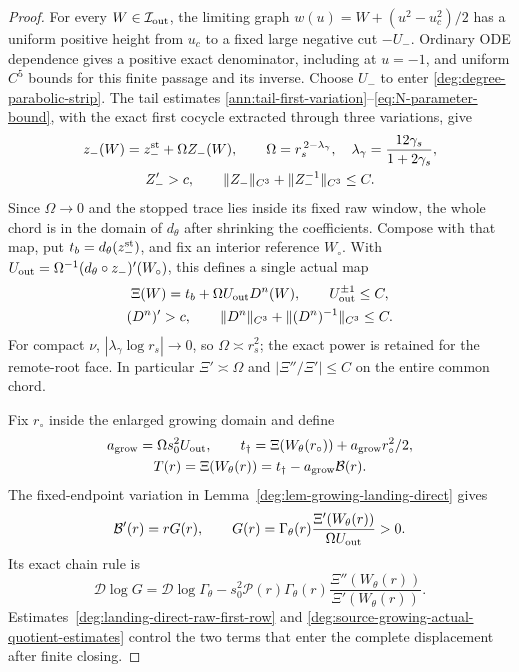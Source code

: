 \begin{proof}
For every \(W\in\mathcal I_{\rm out}\), the limiting graph
\(w(u)=W+(u^2-u_c^2)/2\) has a uniform positive height from
\(u_c\) to a fixed large negative cut \(-U_-\). Ordinary ODE
dependence gives a positive exact denominator, including at \(u=-1\),
and uniform \(C^5\) bounds for this finite passage and its inverse.
Choose \(U_-\) to enter \eqref{deg:degree-parabolic-strip}.
The tail estimates
\eqref{ann:tail-first-variation}--\eqref{eq:N-parameter-bound},
with the exact first cocycle extracted through three variations, give
\[
 \begin{gathered}
 z_-(W)=z_-^{\rm st}+\Omega Z_-(W),\qquad
 \Omega=r_s^{\,2-\lambda_\gamma},\quad
 \lambda_\gamma=\frac{12\gamma_s}{1+2\gamma_s},\\
 Z_-'>c,\qquad \|Z_-\|_{C^3}+\|Z_-^{-1}\|_{C^3}\le C.
 \end{gathered}
\]
Since \(\Omega\to0\) and the stopped trace lies inside its fixed raw
window, the whole chord is in the domain of \(d_\theta\) after shrinking
the coefficients. Compose with that map, put \(t_b=d_\theta(z_-^{\rm st})\),
and fix an interior reference \(W_\circ\). With
\(U_{\rm out}=\Omega^{-1}(d_\theta\circ z_-)'(W_\circ)\),
this defines a single actual map
\begin{equation}\label{deg:fixed-exit-actual-output}
 \begin{gathered}
 \Xi(W)=t_b+\Omega U_{\rm out}D^n(W),\qquad U_{\rm out}^{\pm1}\le C,\\
 (D^n)'>c,\qquad \|D^n\|_{C^3}+\|(D^n)^{-1}\|_{C^3}\le C.
 \end{gathered}
\end{equation}
For compact \(\nu\), \(|\lambda_\gamma\log r_s|\to0\), so
\(\Omega\asymp r_s^2\); the exact power is retained for the remote-root
face. In particular \(\Xi'\asymp\Omega\) and
\(|\Xi''/\Xi'|\le C\) on the entire common chord.

Fix \(r_\circ\) inside the enlarged growing domain and define
\[
 \begin{gathered}
 a_{\rm grow}=\Omega s_0^2U_{\rm out},\qquad
 t_\dagger=\Xi(W_\theta(r_\circ))+a_{\rm grow}r_\circ^2/2,\\
 T(r)=\Xi(W_\theta(r))=t_\dagger-a_{\rm grow}\mathcal B(r).
 \end{gathered}
\]
The fixed-endpoint variation in
Lemma~\ref{deg:lem-growing-landing-direct} gives
\begin{equation}\label{deg:degree-growing-output}
 \mathcal B'(r)=rG(r),\qquad
 G(r)=\Gamma_\theta(r)
              \frac{\Xi'(W_\theta(r))}{\Omega U_{\rm out}}>0.
\end{equation}
Its exact chain rule is
\begin{equation}\label{deg:source-growing-output-log-row}
 \mathcal D\log G=
 \mathcal D\log\Gamma_\theta
 -s_0^2\mathcal P(r)\Gamma_\theta(r)
                  \frac{\Xi''(W_\theta(r))}{\Xi'(W_\theta(r))}.
\end{equation}
Estimates~\eqref{deg:landing-direct-raw-first-row} and
\eqref{deg:source-growing-actual-quotient-estimates} control the two
terms that enter the complete displacement after finite closing.


\end{proof}
